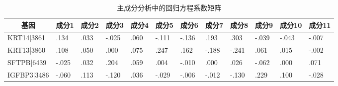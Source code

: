 \begin{table}[h]
\centering
\caption{主成分分析中的回归方程系数矩阵}
\begin{tabular}{llllllllllll}
\hline
\multicolumn{1}{c}{\textbf{基因}} & \multicolumn{1}{c}{\textbf{成分1}} & \multicolumn{1}{c}{\textbf{成分2}} & \multicolumn{1}{c}{\textbf{成分3}} & \multicolumn{1}{c}{\textbf{成分4}} & \multicolumn{1}{c}{\textbf{成分5}} & \multicolumn{1}{c}{\textbf{成分6}} & \multicolumn{1}{c}{\textbf{成分7}} & \multicolumn{1}{c}{\textbf{成分8}} & \multicolumn{1}{c}{\textbf{成分9}} & \multicolumn{1}{c}{\textbf{成分10}} & \multicolumn{1}{c}{\textbf{成分11}} \\ \hline
KRT14|3861                      & .134                             & .033                             & -.025                            & .060                             & -.111                            & -.136                            & .193                             & .303                             & -.039                            & -.043                             & -.007                             \\
KRT13|3860                      & .108                             & .050                             & .000                             & .075                             & .247                             & .162                             & -.188                            & -.241                            & .061                             & .015                              & -.002                             \\
SFTPB|6439                      & -.025                            & .032                             & .204                             & .059                             & .004                             & -.010                            & .000                             & .026                             & -.062                            & .000                              & .071                              \\

IGFBP3|3486                     & -.060                            & .113                             & -.120                            & .036                             & -.029                            & -.006                            & -.012                            & -.130                            & .229                             & .100                              & -.028                            \\ \hline
\end{tabular}
\end{table}



